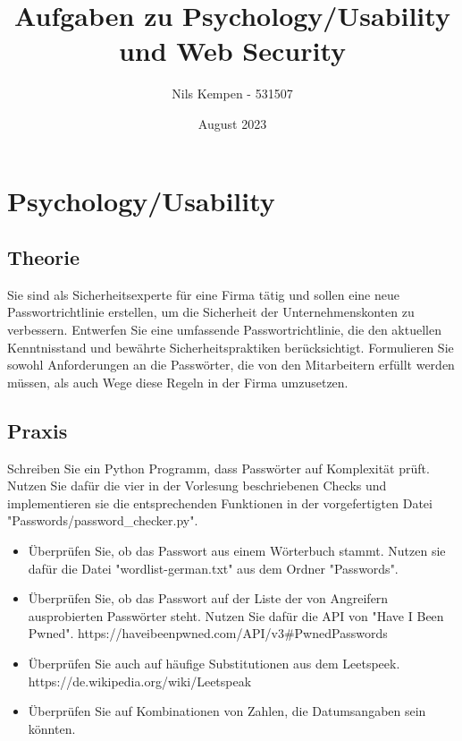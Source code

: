 \documentclass[ngerman]{article}
\title{Aufgaben zu Psychology/Usability und Web Security}
\author{Nils Kempen - 531507}
\date{August 2023}
\begin{document}
\maketitle


\section{Psychology/Usability}

\subsection{Theorie}
Sie sind als Sicherheitsexperte für eine Firma tätig und sollen eine neue Passwortrichtlinie erstellen, um die Sicherheit der Unternehmenskonten zu verbessern. Entwerfen Sie eine umfassende Passwortrichtlinie, die den aktuellen Kenntnisstand und bewährte Sicherheitspraktiken berücksichtigt.
Formulieren Sie sowohl Anforderungen an die Passwörter, die von den Mitarbeitern erfüllt werden müssen, als auch Wege diese Regeln in der Firma umzusetzen.

\subsection{Praxis}
Schreiben Sie ein Python Programm, dass Passwörter auf Komplexität prüft. Nutzen Sie dafür die vier in der Vorlesung beschriebenen Checks und implementieren sie die entsprechenden Funktionen in der vorgefertigten Datei "Passwords/password\_checker.py".

\begin{itemize}
    \item Überprüfen Sie, ob das Passwort aus einem Wörterbuch stammt. Nutzen sie dafür die Datei "wordlist-german.txt" aus dem Ordner "Passwords".
    \item Überprüfen Sie, ob das Passwort auf der Liste der von Angreifern ausprobierten Passwörter steht. Nutzen Sie dafür die API von "Have I Been Pwned". https://haveibeenpwned.com/API/v3\#PwnedPasswords
    \item Überprüfen Sie auch auf häufige Substitutionen aus dem Leetspeek. https://de.wikipedia.org/wiki/Leetspeak
    \item Überprüfen Sie auf Kombinationen von Zahlen, die Datumsangaben sein könnten.
\end{itemize}
\end{document}
